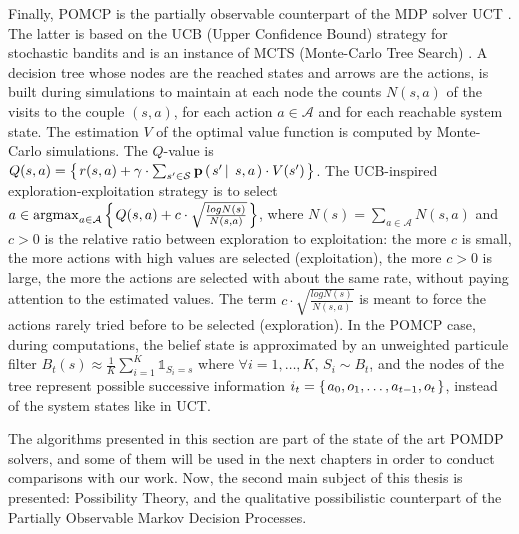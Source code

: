 Finally, POMCP \cite{NIPS2010_4031} is the partially observable counterpart 
of the MDP solver UCT \cite{Kocsis:2006:BBM:2091602.2091633}. 
The latter is based on the UCB (Upper Confidence Bound) strategy for stochastic bandits \cite{Auer:2002:FAM:599614.599677}
and is an instance of MCTS (Monte-Carlo Tree Search) \cite{2008}.
A decision tree whose nodes are the reached states and arrows are the actions, 
is built during simulations to maintain at each node
the counts $N(s,a)$ of the visits to the couple $(s,a)$, 
for each action $a \in \mathcal{A}$ and for each reachable system state.
The estimation $V$ of the optimal value function
is computed by Monte-Carlo simulations.
The $Q$-value is $Q(s,a) = \left\{ \left.  r(s,a) + \gamma \cdot \sum_{s' \in \mathcal{S}} \textbf{p} \left( \left.  s' \, \right| \left. \, s,a  \right. \right) \cdot V(s')  \right. \right\}$.
The UCB-inspired exploration-exploitation strategy is to select 
$a \in \operatorname*{argmax}_{a \in \mathcal{A}} \left\{ \left.  Q(s,a)+ c \cdot \sqrt{ \frac{log N(s)}{N(s,a)} }  \right. \right\}$, 
where $N(s) = \sum_{a \in \mathcal{A}} N(s,a)$ 
and $c>0$ is the relative ratio between exploration to exploitation: 
the more $c$ is small, the more actions with high values are selected (exploitation),
the more $c>0$ is large, the more the actions are selected with about the same rate,
without paying attention to the estimated values. 
The term $c \cdot \sqrt{ \frac{log N(s)}{N(s,a)} }$ is meant to
force the actions rarely tried before to be selected (exploration).
In the POMCP case, during computations, 
the belief state is approximated 
by an unweighted particule filter $B_t(s) \approx \frac{1}{K} \sum_{i=1}^{K} \mathds{1}_{S_i = s}$
where $\forall i=1,\ldots,K$, $S_i \sim B_t$, 
and the nodes of the tree represent possible successive information 
$i_t = \left\{ \left. a_0,o_1,\ldots,a_{t-1},o_t \right. \right\}$, 
instead of the system states like in UCT.

The algorithms presented in this section 
are part of the state of the art POMDP solvers,
and some of them will be used in the next chapters
in order to conduct comparisons with our work.
Now, the second main subject of this thesis
is presented: Possibility Theory, and the qualitative possibilistic counterpart
of the Partially Observable Markov Decision Processes.

